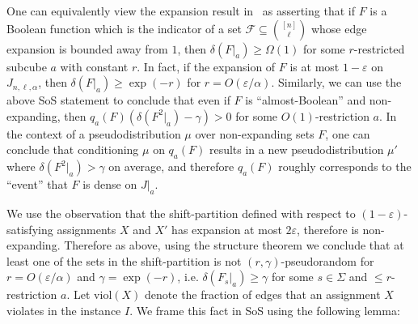 \documentclass[11pt]{article}
\def \sos {SoS\xspace}
\def \eps {{\varepsilon}}
\def \viol {\mathrm{viol}}
\theoremstyle{definition}
\begin{document}
One can equivalently view the expansion result in~\cite{KMMS} as asserting that if $F$ is a Boolean function which is the
indicator of a set $\mathcal{F}\subseteq \binom{[n]}{\ell}$ whose edge 
expansion is bounded away from $1$, then $\delta(F|_{a})\geq \Omega(1)$ for 
some $r$-restricted subcube $a$ with constant $r$. In fact, if the expansion of $F$ is at most $1-\eps$ on $J_{n,\ell,\alpha}$, then $\delta(F|_a) \geq \exp(-r)$ for $r = O(\eps/\alpha)$. Similarly, we can use the above \sos statement to conclude that even if $F$ is ``almost-Boolean'' and non-expanding, then $q_a(F)(\delta(F^2|_a) - \gamma) > 0$ for some $O(1)$-restriction $a$. In the context of a pseudodistribution $\mu$ over non-expanding sets $F$, one can conclude that conditioning $\mu$ on $q_a(F)$ results in a new pseudodistribution $\mu'$ where $\delta(F^2|_a) > \gamma$ on average, and therefore $q_a(F)$ roughly corresponds to the ``event'' that $F$ is dense on $J|_a$.

We use the observation that the shift-partition defined with respect to $(1-\eps)$-satisfying assignments $X$ and $X'$ has expansion at most $2\eps$, therefore is non-expanding. Therefore as above, using the structure theorem we conclude that at least one of the sets in the shift-partition is not $(r,\gamma)$-pseudorandom for $r = O(\eps/\alpha)$ and $\gamma = \exp(-r)$, i.e. $\delta(F_s|_a) \geq \gamma$ for some $s \in \Sigma$ and $\leq r$-restriction $a$. Let $\viol(X)$ denote the fraction of edges that an assignment $X$ violates in the instance $I$. We frame this fact in \sos using the following lemma:
\end{document}
